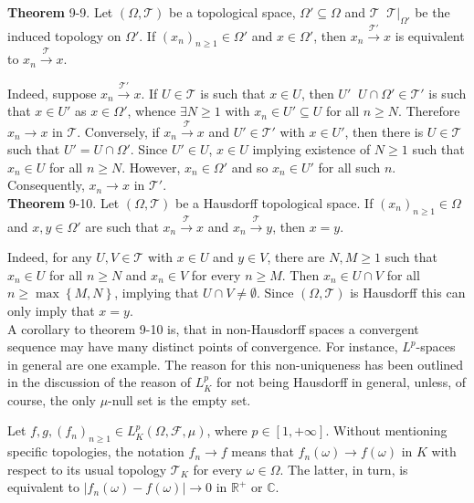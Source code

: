 \documentclass[a4paper]{article}
\newcommand{\obj}[1]{\left\{ #1 \right \}}
\newcommand{\clo}[1]{\left [ #1 \right ]}
\newcommand{\brac}[1]{\left ( #1 \right )}
\newcommand{\induc}[1]{\left . #1 \right \vert}
\newcommand{\abs}[1]{\left | #1 \right |}
\newcommand{\Real}{\mathbb{R}}
\newcommand{\Cplx}{\mathbb{C}}
\newcommand{\Tcal}{\mathcal{T}}
\newcommand{\Fcal}{\mathcal{F}}
\newcommand{\defn}{\mathop{\overset{\Delta}{=}}\nolimits}
\begin{document}
\label{thm:subsp_conv} \noindent \textbf{Theorem} 9-9.
Let $\brac{\Omega, \Tcal}$ be a topological space, $\Omega'\subseteq \Omega$ and $\Tcal\defn \induc{\Tcal}_{\Omega'}$ be the induced topology on $\Omega'$. If $\brac{x_n}_{n\geq 1}\in \Omega'$ and $x\in \Omega'$, then $x_n\overset{\Tcal'}{\to} x$ is equivalent to $x_n\overset{\Tcal}{\to} x$.

Indeed, suppose $x_n\overset{\Tcal'}{\to} x$. If $U\in \Tcal$ is such that $x\in U$, then $U'\defn U\cap \Omega'\in \Tcal'$ is such that $x\in U'$ as $x\in \Omega'$, whence $\exists N\geq 1$ with $x_n\in U'\subseteq U$ for all $n\geq N$. Therefore $x_n\to x$ in $\Tcal$. Conversely, if $x_n\overset{\Tcal}{\to} x$ and $U'\in \Tcal'$ with $x\in U'$, then there is $U\in \Tcal$ such that $U'=U\cap \Omega'$. Since $U'\in U$, $x\in U$ implying existence of $N\geq 1$ such that $x_n\in U$ for all $n\geq N$. However, $x_n\in \Omega'$ and so $x_n\in U'$ for all such $n$. Consequently, $x_n\to x$ in $\Tcal'$.\\

\label{thm:hausdorff_conv} \noindent \textbf{Theorem} 9-10.
Let $\brac{\Omega, \Tcal}$ be a Hausdorff topological space. If $\brac{x_n}_{n\geq 1}\in \Omega$ and $x,y\in \Omega'$ are such that $x_n\overset{\Tcal}{\to} x$ and $x_n\overset{\Tcal}{\to} y$, then $x=y$.

Indeed, for any $U,V\in \Tcal$ with $x\in U$ and $y\in V$, there are $N,M\geq 1$ such that $x_n\in U$ for all $n\geq N$ and $x_n\in V$ for every $n\geq M$. Then $x_n\in U\cap V$ for all $n\geq \max\obj{M,N}$, implying that $U\cap V\neq \emptyset$. Since $\brac{\Omega, \Tcal}$ is Hausdorff this can only imply that $x=y$.\\

A corollary to theorem 9-10 is, that in non-Hausdorff spaces a convergent sequence may have many distinct points of convergence. For instance, $L^p$-spaces in general are one example. The reason for this non-uniqueness has been outlined in the discussion of the reason of $L^p_K$ for not being Hausdorff in general, unless, of course, the only $\mu$-null set is the empty set.

Let $f,g,\brac{f_n}_{n\geq 1} \in L^p_K\brac{\Omega, \Fcal, \mu}$, where $p\in \clo{1,+\infty}$. Without mentioning specific topologies, the notation $f_n\to f$ means that $f_n\brac{\omega}\to f\brac{\omega}$ in $K$ with respect to its usual topology $\Tcal_K$ for every $\omega \in \Omega$. The latter, in turn, is equivalent to $\abs{f_n\brac{\omega}-f\brac{\omega}}\to 0$ in $\Real^+$ or $\Cplx$.
\end{document}
